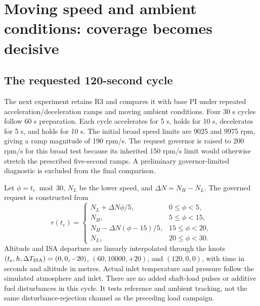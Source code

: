 



\section{Moving speed and ambient conditions: coverage becomes decisive}
\subsection{The requested 120-second cycle}
The next experiment retains R3 and compares it with base PI under repeated acceleration/deceleration ramps and moving ambient conditions. Four 30 s cycles follow 60 s preparation. Each cycle accelerates for 5 s, holds for 10 s, decelerates for 5 s, and holds for 10 s. The initial broad speed limits are 9025 and 9975 rpm, giving a ramp magnitude of 190 rpm/s. The request governor is raised to 200 rpm/s for this broad test because its inherited 150 rpm/s limit would otherwise stretch the prescribed five-second ramps. A preliminary governor-limited diagnostic is excluded from the final comparison.

Let $\phi=t_e\bmod30$, $N_L$ be the lower speed, and $\Delta N=N_H-N_L$. The governed request is constructed from
\begin{equation}
r(t_e)=\begin{cases}
N_L+\Delta N\phi/5,&0\leq\phi<5,\\
N_H,&5\leq\phi<15,\\
N_H-\Delta N(\phi-15)/5,&15\leq\phi<20,\\
N_L,&20\leq\phi<30.
\end{cases}
\end{equation}
Altitude and ISA departure are linearly interpolated through the knots $(t_e,h,\Delta T_{\rm ISA})=(0,0,-20)$, $(60,10000,+20)$, and $(120,0,0)$, with time in seconds and altitude in metres. Actual inlet temperature and pressure follow the simulated atmosphere and inlet. There are no added shaft-load pulses or additive fuel disturbances in this cycle. It tests reference and ambient tracking, not the same disturbance-rejection channel as the preceding load campaign.


